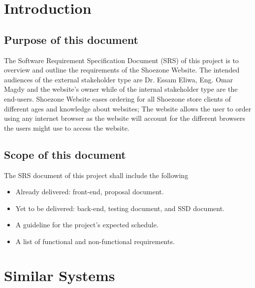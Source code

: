 \documentclass[12pt]{article}
\begin{document}
\section{Introduction}
\subsection{Purpose of this document}
The Software Requirement Specification Document (SRS) of this project is to overview and outline the requirements of the Shoezone Website. The intended audiences of the external stakeholder type are Dr. Essam Eliwa, Eng. Omar Magdy and the website's owner while of the internal stakeholder type are the end-users. Shoezone Website eases ordering for all Shoezone store clients of different ages and knowledge about websites; The website allows the user to order using any internet browser as the website will account for the different browsers the users might use to access the website.
\subsection{Scope of this document}
The SRS document of this project shall include the following
\begin{itemize}
\item Already delivered: front-end, proposal document.
\item Yet to be delivered: back-end, testing document, and SSD document.
\item A guideline for the project's expected schedule.
\item A list of functional and non-functional requirements.
\end{itemize}





\section{Similar Systems}
\end{document}
